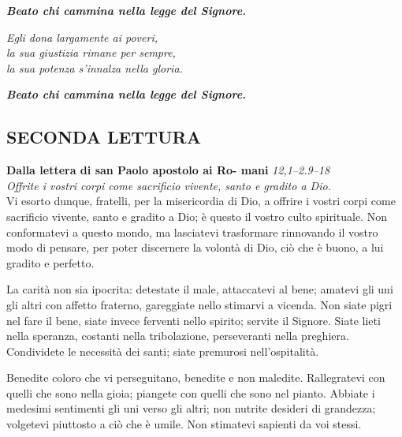 \documentclass[10pt,b6paper,usenames,twoside]{article}
\begin{document}
\hfill\begin{minipage}{\dimexpr\textwidth-1cm}
\textbf{\textit{Beato chi cammina nella legge del Signore.}}\\
\end{minipage}

\noindent \textit{Egli dona largamente ai poveri,\\
la sua giustizia rimane per sempre,\\
la sua potenza s'innalza nella gloria.}\\

\hfill\begin{minipage}{\dimexpr\textwidth-1cm}
\textbf{\textit{Beato chi cammina nella legge del Signore.}}\\
\end{minipage}

\subsection*{\textcolor{forestgreen(traditional)}{SECONDA LETTURA}} 
\noindent \textbf{Dalla lettera di san Paolo apostolo ai Ro- \linebreak mani} \hfill \textcolor{forestgreen(traditional)}{\textit{12,1--2.9--18}}\\ 
\textcolor{forestgreen(traditional)}{\textit{\footnotesize{Offrite i vostri corpi come sacrificio vivente, santo e gradito a Dio.}}}\\ 

Vi esorto dunque, fratelli, per la misericordia di Dio, a offrire i vostri corpi come sacrificio vivente, santo e gradito a Dio; è questo il vostro culto spirituale. Non conformatevi a questo mondo, ma lasciatevi trasformare rinnovando il vostro modo di pensare, per poter discernere la volontà di Dio, ciò che è buono, a lui gradito e perfetto. 

La carità non sia ipocrita: detestate il male, attaccatevi al bene; amatevi gli uni gli altri con affetto fraterno, gareggiate nello stimarvi a vicenda. Non siate pigri nel fare il bene, siate invece ferventi nello spirito; servite il Signore. Siate lieti nella speranza, costanti nella tribolazione, perseveranti nella preghiera. Condividete le necessità dei santi; siate premurosi nell'ospitalità.

Benedite coloro che vi perseguitano, benedite e non maledite. Rallegratevi con quelli che sono nella gioia; piangete con quelli che sono nel pianto. Abbiate i medesimi sentimenti gli uni verso gli altri; non nutrite desideri di grandezza; volgetevi piuttosto a ciò che è umile. Non stimatevi sapienti da voi stessi. 
  
\end{document}
